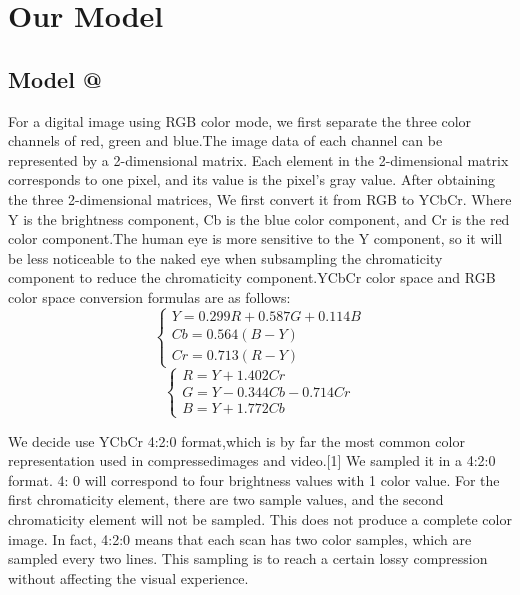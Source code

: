 \documentclass{mcmthesis}
\makeatletter
\newcommand{\Rmnum}[1]{\expandafter\@slowromancap\romannumeral #1@}
\makeatother
\begin{document}
\section{Our Model}
\subsection{Model \Rmnum{1}}
For a digital image using RGB color mode, we first separate the three color channels of red, green and blue.The image data of each channel can be represented by a 2-dimensional matrix. Each element in the 2-dimensional matrix corresponds to one pixel, and its value is the pixel's gray value. After obtaining the three 2-dimensional matrices, We first convert it from RGB to YCbCr. Where Y is the brightness component, Cb is the blue color component, and Cr is the red color component.The human eye is more sensitive to the Y component, so it will be less noticeable to the naked eye when subsampling the chromaticity component to reduce the chromaticity component.YCbCr color space and RGB color space conversion formulas are as follows:
\begin{equation}
\begin{cases}Y=0.299R+0.587G+0.114B\\Cb=0.564(B-Y)\\Cr=0.713(R-Y)\end{cases}
\end{equation}
\begin{equation}
\begin{cases}R=Y+1.402Cr\\G=Y-0.344Cb-0.714Cr\\B=Y+1.772Cb\end{cases}
\end{equation}


We decide use YCbCr 4:2:0 format,which is by far the most common color representation used in compressedimages and video.[1] 
We sampled it in a 4:2:0 format. 4: 0 will correspond to four brightness values with 1 color value. For the first chromaticity element, there are two sample values, and the second chromaticity element will not be sampled. This does not produce a complete color image. In fact, 4:2:0 means that each scan has two color samples, which are sampled every two lines.
This sampling is to reach a certain lossy compression without affecting the visual experience.
\end{document}
